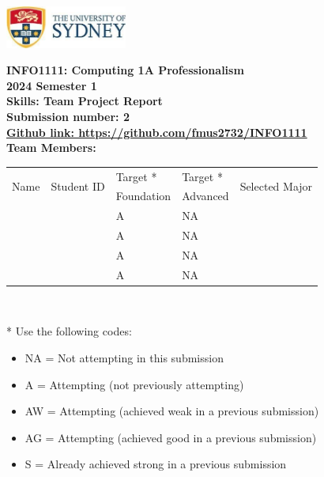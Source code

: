 \documentclass[a4paper, 11pt]{report}
\begin{document}
\begin{titlepage}
\begin{flushright}
\includegraphics[width=4cm]{USyd}\\[1cm]
\end{flushright}

\begin{centering}
\textbf{\huge INFO1111: Computing 1A Professionalism}\\[0.75cm]
\textbf{\huge 2024 Semester 1}\\[2cm]
\textbf{\huge Skills: Team Project Report}\\[2cm]

\textbf{\large Submission number: 2}\\[0.5cm]
\textbf{\large \href{https://github.com/fmus2732/INFO1111}{Github link: https://github.com/fmus2732/INFO1111}}\\[0.75cm]
\textbf{\huge Team Members:}\\[0.75cm]

\begin{tabular}{|p{}|p{}|p{}|p{}|p{}|}
	\hline
	\multirow{2}{*}{Name} & \multirow{2}{*}{Student ID} & Target * & Target * & \multirow{2}{*}{Selected Major} \\
	 & & Foundation & Advanced & \\
	\hline
	\hline
	\raggedright{\studA} & \sidA & A & NA & \majA \\
	\hline
	\raggedright{\studB} & \sidB & A & NA & \majB \\
	\hline
	\raggedright{\studC} & \sidC & A & NA & \majC \\
	\hline
	\raggedright{\studD} & \sidD & A & NA & \majD \\
	\hline
\end{tabular}
\\[0.5cm]
\end{centering}

* Use the following codes:
\begin{itemize}
\setlength\itemsep{0em}
\item NA = Not attempting in this submission
\item A = Attempting (not previously attempting)
\item AW = Attempting (achieved weak in a previous submission) 
\item AG = Attempting (achieved good in a previous submission)
\item S = Already achieved strong in a previous submission
\end{itemize}

\thispagestyle{empty}
\end{titlepage}
\end{document}

